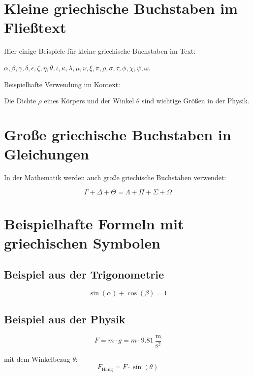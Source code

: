 \documentclass[twoside]{scrreprt}
\begin{document}
\section{Kleine griechische Buchstaben im Fließtext}

Hier einige Beispiele für kleine griechische Buchstaben im Text:

\noindent $\alpha, \beta, \gamma, \delta, \epsilon, \zeta, \eta, \theta, \iota, \kappa, \lambda, \mu, \nu, \xi, \pi, \rho, \sigma, \tau, \phi, \chi, \psi, \omega$.

\noindent Beispielhafte Verwendung im Kontext:

\noindent Die Dichte $\rho$ eines Körpers und der Winkel $\theta$ sind wichtige Größen in der Physik.

\section{Große griechische Buchstaben in Gleichungen}

In der Mathematik werden auch große griechische Buchstaben verwendet:

\[
\Gamma + \Delta + \Theta = \Lambda + \Pi + \Sigma + \Omega
\] 



\section{Beispielhafte Formeln mit griechischen Symbolen}


\subsection{Beispiel aus der Trigonometrie}

\[
\sin(\alpha) + \cos(\beta) = 1
\]

\subsection{Beispiel aus der Physik}

\[
F = m \cdot g = m \cdot 9.81~\frac{\text{m}}{\text{s}^2}
\]

\noindent mit dem Winkelbezug $\theta$:
\[
F_\text{Hang} = F \cdot \sin(\theta)
\]

\end{document}

